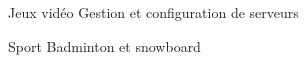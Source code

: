 
\begin{cvskills}

	\cvskill
	{Jeux vidéo}
    {Gestion et configuration de serveurs}

	\cvskill
	{Sport}
    {Badminton et snowboard}

\end{cvskills}
